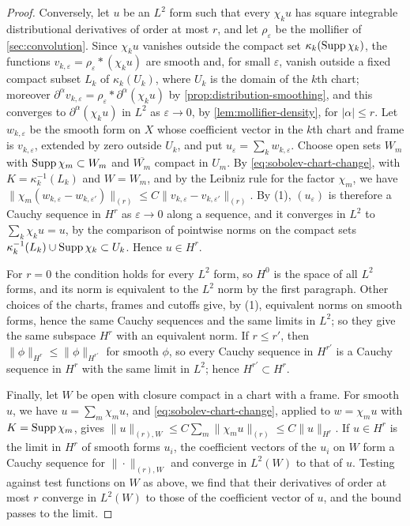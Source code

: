 \begin{proof}
Conversely, let $u$ be an $L^2$ form such that every $\chi_ku$ has square integrable distributional derivatives of order at most $r$, and let $\rho_\varepsilon$ be the mollifier of \cref{sec:convolution}. Since $\chi_ku$ vanishes outside the compact set $\kappa_k(\operatorname{Supp}\chi_k)$, the functions $v_{k,\varepsilon}=\rho_\varepsilon*(\chi_ku)$ are smooth and, for small $\varepsilon$, vanish outside a fixed compact subset $L_k$ of $\kappa_k(U_k)$, where $U_k$ is the domain of the $k$th chart; moreover $\partial^\alpha v_{k,\varepsilon}=\rho_\varepsilon*\partial^\alpha(\chi_ku)$ by \cref{prop:distribution-smoothing}, and this converges to $\partial^\alpha(\chi_ku)$ in $L^2$ as $\varepsilon\to0$, by \cref{lem:mollifier-density}, for $|\alpha|\leq r$. Let $w_{k,\varepsilon}$ be the smooth form on $X$ whose coefficient vector in the $k$th chart and frame is $v_{k,\varepsilon}$, extended by zero outside $U_k$, and put $u_\varepsilon=\sum_kw_{k,\varepsilon}$. Choose open sets $W_m$ with $\operatorname{Supp}\chi_m\subset W_m$ and $\overline{W_m}$ compact in $U_m$. By \eqref{eq:sobolev-chart-change}, with $K=\kappa_k^{-1}(L_k)$ and $W=W_m$, and by the Leibniz rule for the factor $\chi_m$, we have $\|\chi_m(w_{k,\varepsilon}-w_{k,\varepsilon'})\|_{(r)}\leq C\|v_{k,\varepsilon}-v_{k,\varepsilon'}\|_{(r)}$. By (1), $(u_\varepsilon)$ is therefore a Cauchy sequence in $H^r$ as $\varepsilon\to0$ along a sequence, and it converges in $L^2$ to $\sum_k\chi_ku=u$, by the comparison of pointwise norms on the compact sets $\kappa_k^{-1}(L_k)\cup\operatorname{Supp}\chi_k\subset U_k$. Hence $u\in H^r$.

For $r=0$ the condition holds for every $L^2$ form, so $H^0$ is the space of all $L^2$ forms, and its norm is equivalent to the $L^2$ norm by the first paragraph. Other choices of the charts, frames and cutoffs give, by (1), equivalent norms on smooth forms, hence the same Cauchy sequences and the same limits in $L^2$; so they give the same subspace $H^r$ with an equivalent norm. If $r\leq r'$, then $\|\phi\|_{H^r}\leq\|\phi\|_{H^{r'}}$ for smooth $\phi$, so every Cauchy sequence in $H^{r'}$ is a Cauchy sequence in $H^r$ with the same limit in $L^2$; hence $H^{r'}\subset H^r$.

Finally, let $W$ be open with closure compact in a chart with a frame. For smooth $u$, we have $u=\sum_m\chi_mu$, and \eqref{eq:sobolev-chart-change}, applied to $w=\chi_mu$ with $K=\operatorname{Supp}\chi_m$, gives $\|u\|_{(r),W}\leq C\sum_m\|\chi_mu\|_{(r)}\leq C\|u\|_{H^r}$. If $u\in H^r$ is the limit in $H^r$ of smooth forms $u_i$, the coefficient vectors of the $u_i$ on $W$ form a Cauchy sequence for $\|\cdot\|_{(r),W}$ and converge in $L^2(W)$ to that of $u$. Testing against test functions on $W$ as above, we find that their derivatives of order at most $r$ converge in $L^2(W)$ to those of the coefficient vector of $u$, and the bound passes to the limit.


\end{proof}
